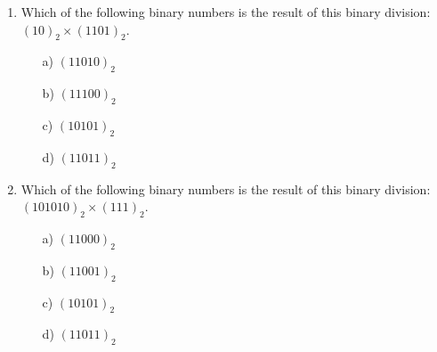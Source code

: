 \documentclass[]{article}
\begin{document}
\begin{enumerate}
\item Which of the following binary numbers is the result of this binary division: $(10)_{2} \times ( 1101)_{2}$. %
\begin{multicols}{2}
\begin{itemize}
\item[a)] $(11010)_{2}$ %
\item[b)] $(11100)_{2}$ %
\item[c)] $(10101)_{2}$ %
\item[d)] $(11011)_2$ %
\end{itemize}
\end{multicols}
\item Which of the following binary numbers is the result of this binary division: $(101010)_{2} \times( 111 )_{2}$. %
\begin{multicols}{2}
\begin{itemize}
\item[a)] $(11000)_{2}$ %
\item[b)] $(11001)_{2}$ %
\item[c)] $(10101)_{2}$ %
\item[d)] $(11011)_2$ %
\end{itemize}
\end{multicols}



\end{enumerate}
\end{document}
